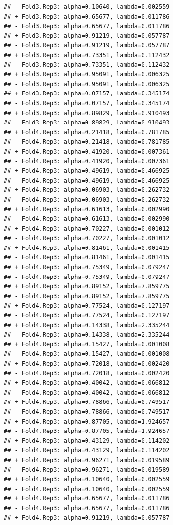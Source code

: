 \documentclass[
]{article}
\begin{document}
\begin{verbatim}
## - Fold3.Rep3: alpha=0.10640, lambda=0.002559 
## + Fold3.Rep3: alpha=0.65677, lambda=0.011786 
## - Fold3.Rep3: alpha=0.65677, lambda=0.011786 
## + Fold3.Rep3: alpha=0.91219, lambda=0.057787 
## - Fold3.Rep3: alpha=0.91219, lambda=0.057787 
## + Fold3.Rep3: alpha=0.73351, lambda=0.112432 
## - Fold3.Rep3: alpha=0.73351, lambda=0.112432 
## + Fold3.Rep3: alpha=0.95091, lambda=0.006325 
## - Fold3.Rep3: alpha=0.95091, lambda=0.006325 
## + Fold3.Rep3: alpha=0.07157, lambda=0.345174 
## - Fold3.Rep3: alpha=0.07157, lambda=0.345174 
## + Fold3.Rep3: alpha=0.89829, lambda=0.910493 
## - Fold3.Rep3: alpha=0.89829, lambda=0.910493 
## + Fold4.Rep3: alpha=0.21418, lambda=0.781785 
## - Fold4.Rep3: alpha=0.21418, lambda=0.781785 
## + Fold4.Rep3: alpha=0.41920, lambda=0.007361 
## - Fold4.Rep3: alpha=0.41920, lambda=0.007361 
## + Fold4.Rep3: alpha=0.49619, lambda=0.466925 
## - Fold4.Rep3: alpha=0.49619, lambda=0.466925 
## + Fold4.Rep3: alpha=0.06903, lambda=0.262732 
## - Fold4.Rep3: alpha=0.06903, lambda=0.262732 
## + Fold4.Rep3: alpha=0.61613, lambda=0.002990 
## - Fold4.Rep3: alpha=0.61613, lambda=0.002990 
## + Fold4.Rep3: alpha=0.70227, lambda=0.001012 
## - Fold4.Rep3: alpha=0.70227, lambda=0.001012 
## + Fold4.Rep3: alpha=0.81461, lambda=0.001415 
## - Fold4.Rep3: alpha=0.81461, lambda=0.001415 
## + Fold4.Rep3: alpha=0.75349, lambda=0.079247 
## - Fold4.Rep3: alpha=0.75349, lambda=0.079247 
## + Fold4.Rep3: alpha=0.89152, lambda=7.859775 
## - Fold4.Rep3: alpha=0.89152, lambda=7.859775 
## + Fold4.Rep3: alpha=0.77524, lambda=0.127197 
## - Fold4.Rep3: alpha=0.77524, lambda=0.127197 
## + Fold4.Rep3: alpha=0.14338, lambda=2.335244 
## - Fold4.Rep3: alpha=0.14338, lambda=2.335244 
## + Fold4.Rep3: alpha=0.15427, lambda=0.001008 
## - Fold4.Rep3: alpha=0.15427, lambda=0.001008 
## + Fold4.Rep3: alpha=0.72018, lambda=0.002420 
## - Fold4.Rep3: alpha=0.72018, lambda=0.002420 
## + Fold4.Rep3: alpha=0.40042, lambda=0.066812 
## - Fold4.Rep3: alpha=0.40042, lambda=0.066812 
## + Fold4.Rep3: alpha=0.78866, lambda=0.749517 
## - Fold4.Rep3: alpha=0.78866, lambda=0.749517 
## + Fold4.Rep3: alpha=0.87705, lambda=1.924657 
## - Fold4.Rep3: alpha=0.87705, lambda=1.924657 
## + Fold4.Rep3: alpha=0.43129, lambda=0.114202 
## - Fold4.Rep3: alpha=0.43129, lambda=0.114202 
## + Fold4.Rep3: alpha=0.96271, lambda=0.019589 
## - Fold4.Rep3: alpha=0.96271, lambda=0.019589 
## + Fold4.Rep3: alpha=0.10640, lambda=0.002559 
## - Fold4.Rep3: alpha=0.10640, lambda=0.002559 
## + Fold4.Rep3: alpha=0.65677, lambda=0.011786 
## - Fold4.Rep3: alpha=0.65677, lambda=0.011786 
## + Fold4.Rep3: alpha=0.91219, lambda=0.057787 

\end{verbatim}
\end{document}
